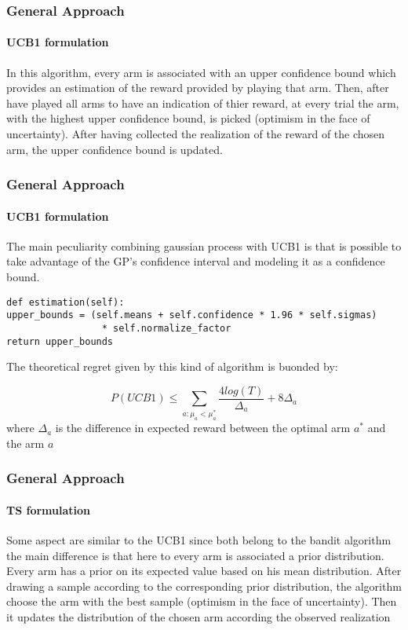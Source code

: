 \documentclass[11pt]{beamer}
\begin{document}

\begin{frame}

\frametitle{General Approach}
\framesubtitle{UCB1 formulation}

In this algorithm, every arm is associated with an upper confidence bound which provides an estimation of the reward provided by playing that arm.
Then, after have played all arms to have an indication of thier reward, at every trial the arm, with the highest upper confidence bound, is picked (optimism in the face of uncertainty).
After having collected the realization of the reward of the chosen arm, the upper confidence bound is updated.


\end{frame}


\begin{frame} [fragile]

\frametitle{General Approach}
\framesubtitle{UCB1 formulation}

The main peculiarity combining gaussian process with UCB1 is that is possible to take advantage of the GP's confidence interval and modeling it as a confidence bound.

\begin{lstlisting}[style=Python, basicstyle=\tiny, numbers=none, framexrightmargin=-20pt]
def estimation(self):
upper_bounds = (self.means + self.confidence * 1.96 * self.sigmas)
                 * self.normalize_factor
return upper_bounds

\end{lstlisting}

The theoretical regret given by this kind of algorithm is buonded by:

\begin{displaymath}
  P(UCB1) \le  \sum_{a:\mu_a < \mu_a^*} \frac{4log(T)}{\Delta_a} + 8\Delta_a 
\end{displaymath}
where $\Delta_a$ is the difference in expected reward between the optimal arm $a^*$ and the arm $a$


\end{frame}


\begin{frame}

\frametitle{General Approach}
\framesubtitle{TS formulation}

Some aspect are similar to the UCB1 since both belong to the bandit algorithm the main difference is that here to every arm is associated a prior distribution.
Every arm has a prior on its expected value based on his mean distribution.
After drawing a sample according to the corresponding prior distribution, the algorithm choose the arm with the best sample (optimism in the face of uncertainty).
Then it updates the distribution of the chosen arm according the observed realization

\end{frame}
\end{document}

